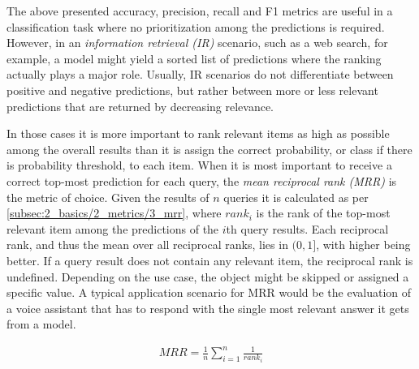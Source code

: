 The above presented accuracy, precision, recall and F1 metrics are useful in a classification task where no prioritization among the predictions is required. However, in an \emph{information retrieval (IR)} scenario, such as a web search, for example, a model might yield a sorted list of predictions where the ranking actually plays a major role. Usually, IR scenarios do not differentiate between positive and negative predictions, but rather between more or less relevant predictions that are returned by decreasing relevance.

In those cases it is more important to rank relevant items as high as possible among the overall results than it is assign the correct probability, or class if there is probability threshold, to each item. When it is most important to receive a correct top-most prediction for each query, the \emph{mean reciprocal rank (MRR)} is the metric of choice. Given the results of $n$ queries it is calculated as per \autoref{subsec:2_basics/2_metrics/3_mrr}, where $rank_i$ is the rank of the top-most relevant item among the predictions of the $i$th query results. Each reciprocal rank, and thus the mean over all reciprocal ranks, lies in $(0, 1]$, with higher being better. If a query result does not contain any relevant item, the reciprocal rank is undefined. Depending on the use case, the object might be skipped or assigned a specific value. A typical application scenario for MRR would be the evaluation of a voice assistant that has to respond with the single most relevant answer it gets from a model.

\begin{align}
    MRR = \frac{1}{n} \sum_{i=1}^{n} \frac{1}{rank_i}
    \label{eq:2_basics/2_metrics/3_mrr/mrr}
\end{align}
